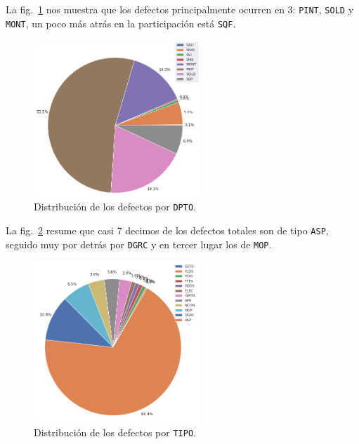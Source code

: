 \documentclass[a4paper,12pt]{article}
\begin{document}
		La fig.~\ref{fig:distgvddpto} nos muestra que los defectos principalmente ocurren en 3: \texttt{PINT}, \texttt{SOLD} y \texttt{MONT}, un poco más atrás en la participación está \texttt{SQF}.
				
		\begin{figure}[H]
			\begin{center}				
				\includegraphics[width=0.56\textwidth]{tesis_53.png}
				\caption{Distribución de los defectos por \texttt{DPTO}.}
				\label{fig:distgvddpto}
			\end{center}
		\end{figure}
				
		La fig.~\ref{fig:distgvdtype} resume que casi 7 decimos de los defectos totales son de tipo \texttt{ASP}, seguido muy por detrás por \texttt{DGRC} y en tercer lugar los de \texttt{MOP}.
				
		\begin{figure}[H]
			\begin{center}				
				\includegraphics[width=0.56\textwidth]{tesis_55.png}
				\caption{Distribución de los defectos por \texttt{TIPO}.}
				\label{fig:distgvdtype}
			\end{center}
		\end{figure}
				
\end{document}
